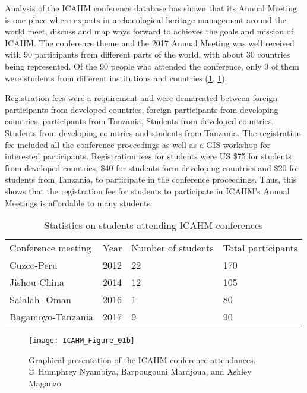 Analysis of the ICAHM conference database has shown that its Annual Meeting is one place where experts in archaeological heritage management around the world meet, discuss and map ways forward to achieves the goals and mission of ICAHM. The conference theme and the 2017 Annual Meeting was well received with 90 participants from different parts of the world, with about 30 countries being represented. Of the 90 people who attended the conference, only 9 of them were students from different institutions and countries (\cref{tab:ICAHM_Table_01}, \cref{fig:ICAHM_Figure_01b}).

Registration fees were a requirement and were demarcated between foreign participants from developed countries, foreign participants from developing countries, participants from Tanzania, Students from developed countries, Students from developing countries and students from Tanzania. The registration fee included all the conference proceedings as well as a GIS workshop for interested participants. Registration fees for students were US \$75 for students from developed countries, \$40 for students form developing countries and \$20 for students from Tanzania, to participate in the conference proceedings. Thus, this shows that the registration fee for students to participate in ICAHM’s Annual Meetings is affordable to many students.

\begin{table}[]
	\centering
	\caption{Statistics on students attending ICAHM conferences}
	\label{tab:ICAHM_Table_01}
	\begin{tabular}{llll}
		Conference meeting & Year & Number of students & Total participants \\
		Cuzco-Peru         & 2012 & 22                 & 170                \\
		Jishou-China       & 2014 & 12                 & 105                \\
		Salalah- Oman      & 2016 & 1                  & 80                 \\
		Bagamoyo-Tanzania  & 2017 & 9                  & 90
	\end{tabular}
\end{table}

\begin{figure}[!tb]
	\texttt{[image: ICAHM\_Figure\_01b]}
	\caption{Graphical presentation of the ICAHM conference attendances.
		{\normalfont\scriptsize \\ \copyright\
			Humphrey Nyambiya, Barpougouni Mardjoua, and Ashley Maganzo %
	}}
	\label{fig:ICAHM_Figure_01b}
\end{figure}

